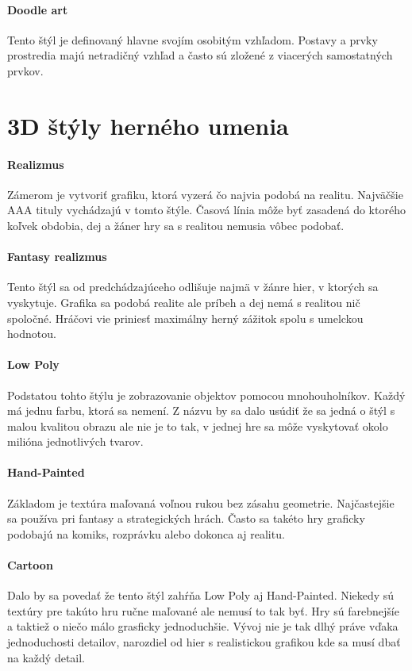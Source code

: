 \documentclass[10pt,twoside,slovak,a4paper]{article}
\begin{document}
\paragraph{Doodle art}
Tento štýl je definovaný hlavne svojím osobitým vzhľadom. Postavy a prvky prostredia majú netradičný vzhľad a často sú zložené z viacerých samostatných prvkov.



\section{3D štýly herného umenia}

\paragraph{Realizmus}
Zámerom je vytvoriť grafiku, ktorá vyzerá čo najvia podobá na realitu. Najväčšie AAA tituly vychádzajú v tomto štýle. Časová línia môže byť zasadená do ktorého koľvek obdobia, dej a žáner hry sa s realitou nemusia vôbec podobať. 


\paragraph{Fantasy realizmus}
Tento štýl sa od predchádzajúceho odlišuje najmä v žánre hier, v ktorých sa vyskytuje. Grafika sa podobá realite ale príbeh a dej nemá s realitou nič spoločné. Hráčovi vie priniesť maximálny herný zážitok spolu s umelckou hodnotou.


\paragraph{Low Poly}
Podstatou tohto štýlu je zobrazovanie objektov pomocou mnohouholníkov. Každý má jednu farbu, ktorá sa nemení. Z názvu by sa dalo usúdiť že sa jedná o štýl s malou kvalitou obrazu ale nie je to tak, v jednej hre sa môže vyskytovať okolo milióna jednotlivých tvarov.


\paragraph{Hand-Painted}
Základom je textúra maľovaná voľnou rukou bez zásahu geometrie. Najčastejšie sa používa pri fantasy a strategických hrách. Často sa takéto hry graficky podobajú na komiks, rozprávku alebo dokonca aj realitu.

\paragraph{Cartoon}
Dalo by sa povedať že tento štýl zahŕňa Low Poly aj Hand-Painted. Niekedy sú textúry pre takúto hru ručne maľované ale nemusí to tak byť. Hry sú farebnejšíe a taktiež o niečo málo grasficky jednoduchšie. Vývoj nie je tak dlhý práve vďaka jednoduchosti detailov, narozdiel od hier s realistickou grafikou kde sa musí dbať na každý detail.
\end{document}
